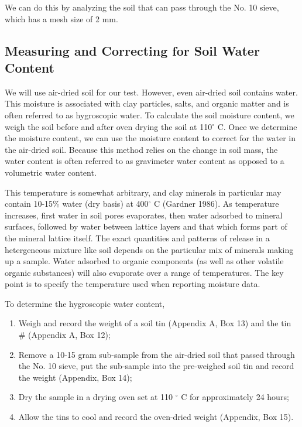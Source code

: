 \documentclass[12pt]{../SOP4_alpha}\usepackage[]{graphicx}\usepackage[]{xcolor}
\begin{document}
\NP We can do this by analyzing the soil that can pass through the No. 10 sieve, which has a mesh size of 2 mm.  

  
\subsection{Measuring and Correcting for Soil Water Content}

\NP We will use air-dried soil for our test. However, even air-dried soil contains water. This moisture is associated with clay particles, salts, and organic matter and is often referred to as hygroscopic water. To calculate the soil moisture content, we weigh the soil before and after oven drying the soil at 110$^\circ$ C. Once we determine the moisture content, we can use the moisture content to correct for the water in the air-dried soil. Because this method relies on the change in soil mass, the water content is often referred to as gravimeter water content as opposed to a volumetric water content.

\NP This temperature is somewhat arbitrary, and clay minerals in particular may contain 10-15\% water (dry basis) at 400$^\circ$ C (Gardner 1986).  As temperature increases, first water in soil pores evaporates, then water adsorbed to mineral surfaces, followed by water between lattice layers and that which forms part of the mineral lattice itself.  The exact quantities and patterns of release in a hetergeneous mixture like soil depends on the particular mix of minerals making up a sample.  Water adsorbed to organic components (as well as other volatile organic substances) will also evaporate over a range of temperatures.  The key point is to specify the temperature used when reporting moisture data.

\NP To determine the hygroscopic water content,

\begin{enumerate}
	\item Weigh and record the weight of a soil tin (Appendix A, Box 13) and the tin \# (Appendix A, Box 12);
	\item Remove a 10-15 gram sub-sample from the air-dried soil that passed through the No. 10 sieve, put the sub-sample into the pre-weighed soil tin and record the weight (Appendix, Box 14);
	\item Dry the sample in a drying oven set at 110 $^\circ$ C for approximately 24 hours;
	\item Allow the tins to cool and record the oven-dried weight (Appendix, Box 15). 
\end{enumerate}
\end{document}
